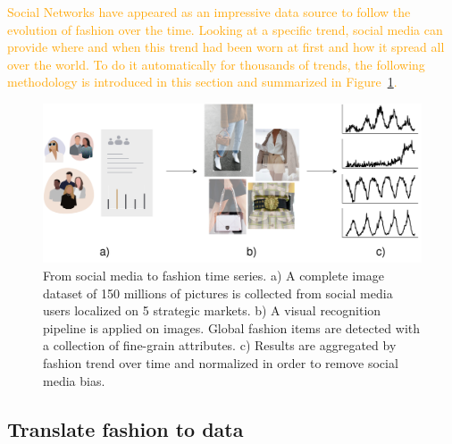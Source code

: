 \documentclass[10pt]{article} %
\begin{document}
\textcolor{orange}{Social Networks have appeared as an impressive data source to follow the evolution of fashion over the time. Looking at a specific trend, social media can provide where and when this trend had been worn at first and how it spread all over the world. To do it automatically for thousands of trends, the following methodology is introduced in this section and summarized in Figure~\ref{fig:pipeline}.}

\begin{figure}
  \centering
    \includegraphics[width=1.\linewidth]{pipeline_archi}
  \caption{From social media to fashion time series. a) A complete image dataset of 150 millions of pictures is collected from social media users localized on 5 strategic markets. b) A visual recognition pipeline is applied on images. Global fashion items are detected with a collection of fine-grain attributes. c) Results are aggregated by fashion trend over time and normalized in order to remove social media bias. }
\label{fig:pipeline}
\end{figure}

\subsection{Translate fashion to data}
\label{sec:dataset:a}
\end{document}
